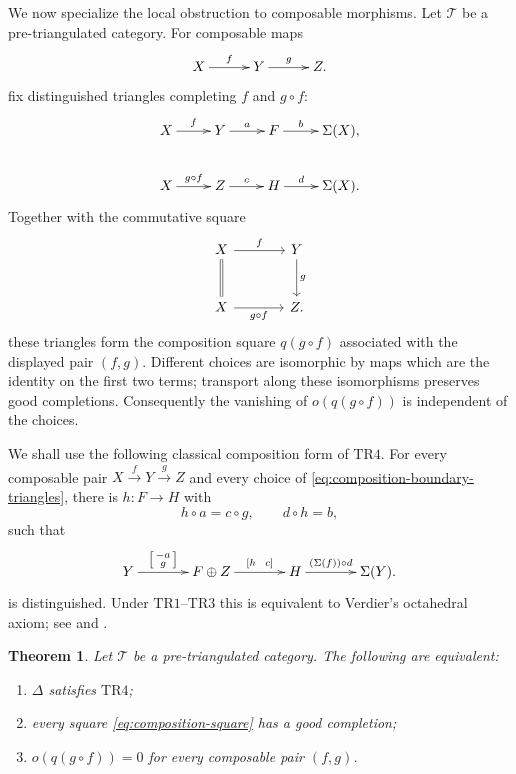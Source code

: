\documentclass[a4paper,11pt,reqno]{amsart}
\newtheorem{theorem}{Theorem}[section]
\theoremstyle{definition}
\theoremstyle{plain}
\numberwithin{equation}{section}
\newcommand{\T}{\mathcal T}
\begin{document}
We now specialize the local obstruction to composable morphisms.  Let $\T$
be a pre-triangulated category.  For composable maps
\begin{equation*}
\xymatrix@C=2.4pc{
X\ar[r]^-{f}&Y\ar[r]^-{g}&Z.
}
\end{equation*}
fix distinguished triangles completing $f$ and $g\circ f$:
\begin{equation}
\label{eq:composition-boundary-triangles}
\xymatrix@C=2.0pc{
X\ar[r]^-{f}&Y\ar[r]^-{a}&F\ar[r]^-{b}&\Sigma(X),\\
X\ar[r]^-{g\circ f}&Z\ar[r]^-{c}&H\ar[r]^-{d}&\Sigma(X).
}
\end{equation}
Together with the commutative square
\begin{equation}
\label{eq:composition-square}
\begin{tikzcd}[column sep=large,row sep=large]
X \arrow[r,"f"] \arrow[d,equal] & Y \arrow[d,"g"]\\
X \arrow[r,"g\circ f"'] & Z.
\end{tikzcd}
\end{equation}
these triangles form the composition square $q(g\circ f)$ associated with
the displayed pair $(f,g)$.
Different choices are isomorphic by maps which are the identity on the first
two terms; transport along these isomorphisms preserves good completions.
Consequently the vanishing of $o(q(g\circ f))$ is independent of the choices.

We shall use the following classical composition form of $\mathrm{TR4}$.
For every composable pair $X\xrightarrow{f}Y\xrightarrow{g}Z$ and every choice
of \eqref{eq:composition-boundary-triangles}, there is $h:F\to H$ with
\[
 h\circ a=c\circ g,\qquad d\circ h=b,
\]
such that
\begin{equation}
\label{eq:homotopy-cartesian-composition}
\xymatrix@C=3.0pc{
Y\ar[r]^-{\left[\begin{smallmatrix}-a\\g\end{smallmatrix}\right]}&
F\oplus Z\ar[r]^-{[h\ \ c]}&H\ar[r]^-{(\Sigma(f))\circ d}&\Sigma(Y).
}
\end{equation}
is distinguished.  Under $\mathrm{TR1}$--$\mathrm{TR3}$ this is equivalent
to Verdier's octahedral axiom; see \cite[Theorem~1.8]{Neeman1991} and
\cite[Proposition~1.4.6]{Neeman2001}.

\begin{theorem}
\label{thm:composition-obstruction}
Let $\T$ be a pre-triangulated category.  The following are
equivalent:
\begin{enumerate}[label=\textup{(\roman*)}]
\item \(\Delta\) satisfies \(\mathrm{TR4}\);
\item every square \eqref{eq:composition-square} has a good completion;
\item $o(q(g\circ f))=0$ for every composable pair $(f,g)$.
\end{enumerate}
\end{theorem}
\end{document}

